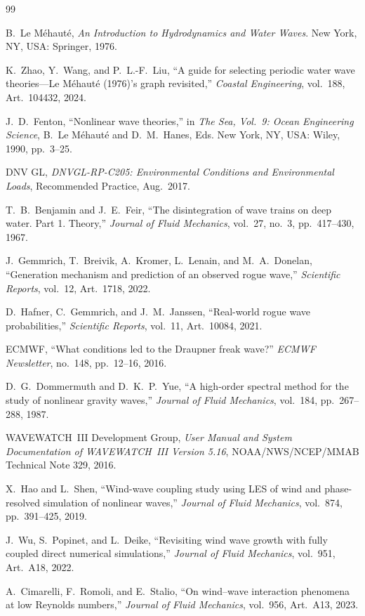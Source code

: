 \documentclass[journal,10pt,twocolumn]{IEEEtran}
\begin{document}
\begin{thebibliography}{99}

B.~Le M\'ehaut\'e,
\emph{An Introduction to Hydrodynamics and Water Waves}.
New York, NY, USA: Springer, 1976.

K.~Zhao, Y.~Wang, and P.~L.-F.~Liu,
``A guide for selecting periodic water wave theories---Le M\'ehaut\'e (1976)'s graph revisited,''
\emph{Coastal Engineering}, vol.~188, Art.~104432, 2024.

J.~D.~Fenton,
``Nonlinear wave theories,''
in \emph{The Sea, Vol.~9: Ocean Engineering Science},
B.~Le M\'ehaut\'e and D.~M.~Hanes, Eds.
New York, NY, USA: Wiley, 1990, pp.~3--25.

DNV GL,
\emph{DNVGL-RP-C205: Environmental Conditions and Environmental Loads},
Recommended Practice, Aug.~2017.

T.~B.~Benjamin and J.~E.~Feir,
``The disintegration of wave trains on deep water. Part 1. Theory,''
\emph{Journal of Fluid Mechanics}, vol.~27, no.~3, pp.~417--430, 1967.

J.~Gemmrich, T.~Breivik, A.~Kromer, L.~Lenain, and M.~A.~Donelan,
``Generation mechanism and prediction of an observed rogue wave,''
\emph{Scientific Reports}, vol.~12, Art.~1718, 2022.

D.~Hafner, C.~Gemmrich, and J.~M.~Janssen,
``Real-world rogue wave probabilities,''
\emph{Scientific Reports}, vol.~11, Art.~10084, 2021.

ECMWF,
``What conditions led to the Draupner freak wave?''
\emph{ECMWF Newsletter}, no.~148, pp.~12--16, 2016.

D.~G.~Dommermuth and D.~K.~P.~Yue,
``A high-order spectral method for the study of nonlinear gravity waves,''
\emph{Journal of Fluid Mechanics}, vol.~184, pp.~267--288, 1987.

WAVEWATCH~III Development Group,
\emph{User Manual and System Documentation of WAVEWATCH~III Version 5.16},
NOAA/NWS/NCEP/MMAB Technical Note 329, 2016.

X.~Hao and L.~Shen,
``Wind-wave coupling study using LES of wind and phase-resolved simulation of nonlinear waves,''
\emph{Journal of Fluid Mechanics}, vol.~874, pp.~391--425, 2019.

J.~Wu, S.~Popinet, and L.~Deike,
``Revisiting wind wave growth with fully coupled direct numerical simulations,''
\emph{Journal of Fluid Mechanics}, vol.~951, Art.~A18, 2022.

A.~Cimarelli, F.~Romoli, and E.~Stalio,
``On wind--wave interaction phenomena at low Reynolds numbers,''
\emph{Journal of Fluid Mechanics}, vol.~956, Art.~A13, 2023.

\end{thebibliography}

\end{document}
